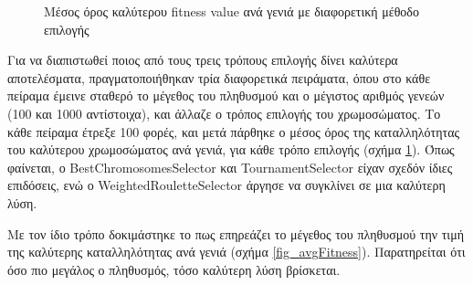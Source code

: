 \begin{figure}[!t]
    \centering
    \caption{Μέσος όρος καλύτερου fitness value ανά γενιά με διαφορετική μέθοδο επιλογής}
    \label{fig_selectorFitness}
\end{figure}

Για να διαπιστωθεί ποιος από τους τρεις τρόπους επιλογής δίνει καλύτερα αποτελέσματα, πραγματοποιήθηκαν τρία διαφορετικά πειράματα, όπου στο κάθε πείραμα έμεινε σταθερό το μέγεθος του πληθυσμού και ο μέγιστος αριθμός γενεών (100 και 1000 αντίστοιχα), και άλλαζε ο τρόπος επιλογής του χρωμοσώματος. Το κάθε πείραμα έτρεξε 100 φορές, και μετά πάρθηκε ο μέσος όρος της καταλληλότητας του καλύτερου χρωμοσώματος ανά γενιά, για κάθε τρόπο επιλογής (σχήμα \ref{fig_selectorFitness}). Όπως φαίνεται, ο BestChromosomesSelector και TournamentSelector είχαν σχεδόν ίδιες επιδόσεις, ενώ ο WeightedRouletteSelector άργησε να συγκλίνει σε μια καλύτερη λύση.

Με τον ίδιο τρόπο δοκιμάστηκε το πως επηρεάζει το μέγεθος του πληθυσμού την τιμή της καλύτερης καταλληλότητας ανά γενιά (σχήμα \ref{fig_avgFitness}). Παρατηρείται ότι όσο πιο μεγάλος ο πληθυσμός, τόσο καλύτερη λύση βρίσκεται.

